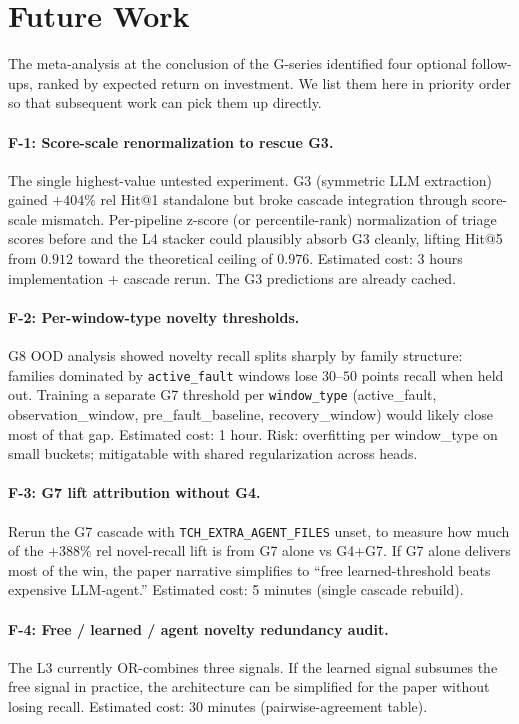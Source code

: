 \section{Future Work}
\label{sec:future}

The meta-analysis at the conclusion of the G-series identified four optional follow-ups, ranked by expected return on investment. We list them here in priority order so that subsequent work can pick them up directly.

\paragraph{F-1: Score-scale renormalization to rescue G3.} The single highest-value untested experiment. G3 (symmetric LLM extraction) gained $+404\%$ rel Hit@1 standalone but broke cascade integration through score-scale mismatch. Per-pipeline z-score (or percentile-rank) normalization of triage scores before \rrf{} and the L4 stacker could plausibly absorb G3 cleanly, lifting Hit@5 from $0.912$ toward the theoretical ceiling of $0.976$. Estimated cost: 3 hours implementation + cascade rerun. The G3 predictions are already cached.

\paragraph{F-2: Per-window-type novelty thresholds.} G8 OOD analysis showed novelty recall splits sharply by family structure: families dominated by \texttt{active\_fault} windows lose $30$--$50$ points recall when held out. Training a separate G7 threshold per \texttt{window\_type} (active\_fault, observation\_window, pre\_fault\_baseline, recovery\_window) would likely close most of that gap. Estimated cost: 1 hour. Risk: overfitting per window\_type on small buckets; mitigatable with shared regularization across heads.

\paragraph{F-3: G7 lift attribution without G4.} Rerun the G7 cascade with \texttt{TCH\_EXTRA\_AGENT\_FILES} unset, to measure how much of the $+388\%$ rel novel-recall lift is from G7 alone vs G4+G7. If G7 alone delivers most of the win, the paper narrative simplifies to ``free learned-threshold beats expensive LLM-agent.'' Estimated cost: 5 minutes (single cascade rebuild).

\paragraph{F-4: Free / learned / agent novelty redundancy audit.} The L3 currently OR-combines three signals. If the learned signal subsumes the free signal in practice, the architecture can be simplified for the paper without losing recall. Estimated cost: 30 minutes (pairwise-agreement table).

